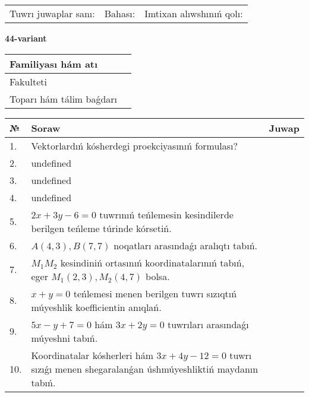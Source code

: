 \documentclass{article}
\begin{document}
\vspace{0.7cm}

\begin{tabular}{lll}
Tuwrı juwaplar sanı: \underline{\hspace{1cm}} & 
Bahası: \underline{\hspace{1cm}} & 
Imtixan alıwshınıń qolı: \underline{\hspace{2cm}} \\
\end{tabular}

\egroup

\newpage


\textbf{44-variant}\\

\bgroup
\def\arraystretch{1.6} %

\begin{tabular}{|m{5.7cm}|m{9.5cm}|}
\hline
Familiyası hám atı & \\
\hline
Fakulteti  & \\
\hline
Toparı hám tálim baǵdarı  & \\
\hline
\end{tabular}

\vspace{0.7cm}

\begin{tabular}{|m{0.7cm}|m{10cm}|m{4cm}|}
\hline
№ & Soraw & Juwap \\
\hline
1. & Vektorlardıń kósherdegi proekciyasınıń formulası? &  \\
\hline
2. & undefined &  \\
\hline
3. & undefined &  \\
\hline
4. & undefined &  \\
\hline
5. & \(2 x + 3 y - 6 = 0\) tuwrınıń teńlemesin kesindilerde berilgen teńleme túrinde kórsetiń. &  \\
\hline
6. & \(A (4, 3), B (7, 7)\) noqatları arasındaǵı aralıqtı tabıń. &  \\
\hline
7. & \(M_{1}M_{2}\) kesindiniń ortasınıń koordinatalarınıń tabıń, eger \(M_{1} (2, 3), M_{2} (4, 7)\) bolsa. &  \\
\hline
8. & \(x + y = 0\) teńlemesi menen berilgen tuwrı sızıqtıń múyeshlik koefficientin anıqlań. &  \\
\hline
9. & \(5 x - y + 7 = 0\) hám \(3 x + 2 y = 0\) tuwrıları arasındaǵı múyeshni tabıń. &  \\
\hline
10. & Koordinatalar kósherleri hám \( 3 x + 4 y - 12 = 0 \) tuwrı sızıǵı menen shegaralanǵan úshmúyeshliktiń maydanın tabıń. & \\
\hline
\end{tabular}
\end{document}
